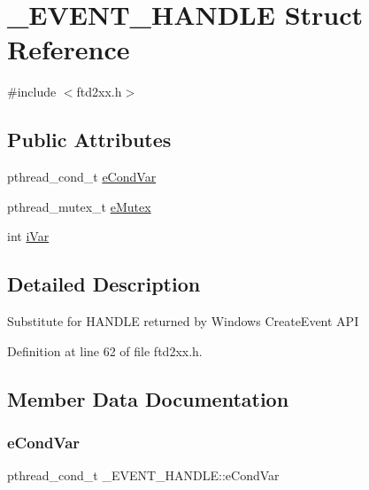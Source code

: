 \hypertarget{struct__EVENT__HANDLE}{}\section{\+\_\+\+E\+V\+E\+N\+T\+\_\+\+H\+A\+N\+D\+LE Struct Reference}
\label{struct__EVENT__HANDLE}


{\ttfamily \#include $<$ftd2xx.\+h$>$}

\subsection*{Public Attributes}
\begin{DoxyCompactItemize}
\item 
pthread\+\_\+cond\+\_\+t \hyperlink{struct__EVENT__HANDLE_a22f9905a075b5f0c84fa336b8532e756}{e\+Cond\+Var}
\item 
pthread\+\_\+mutex\+\_\+t \hyperlink{struct__EVENT__HANDLE_ac18c63dbb1acc29ff1104b80fe7b4269}{e\+Mutex}
\item 
int \hyperlink{struct__EVENT__HANDLE_aa96bc22ec0f4f46df8e3ad9f1bbb7baa}{i\+Var}
\end{DoxyCompactItemize}


\subsection{Detailed Description}
Substitute for H\+A\+N\+D\+LE returned by Windows Create\+Event A\+PI 

Definition at line 62 of file ftd2xx.\+h.



\subsection{Member Data Documentation}
\mbox{\label{struct__EVENT__HANDLE_a22f9905a075b5f0c84fa336b8532e756}} 
\subsubsection{\texorpdfstring{e\+Cond\+Var}{eCondVar}}
{\footnotesize\ttfamily pthread\+\_\+cond\+\_\+t \+\_\+\+E\+V\+E\+N\+T\+\_\+\+H\+A\+N\+D\+L\+E\+::e\+Cond\+Var}



